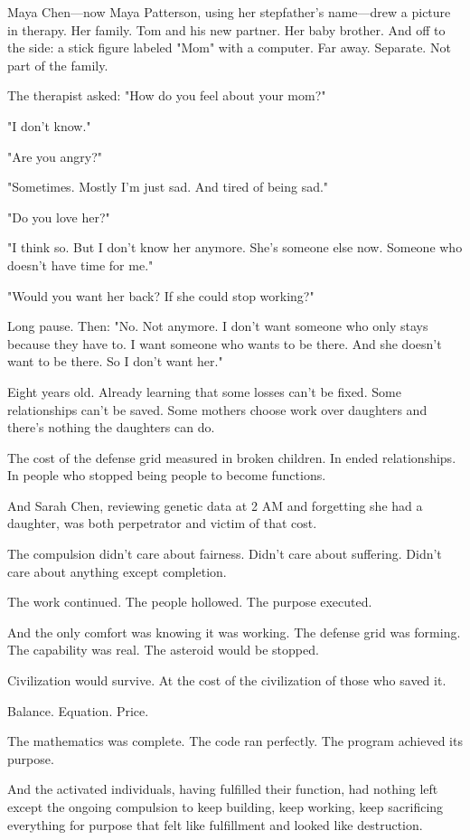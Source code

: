 Maya Chen—now Maya Patterson, using her stepfather's name—drew a picture in therapy. Her family. Tom and his new partner. Her baby brother. And off to the side: a stick figure labeled "Mom" with a computer. Far away. Separate. Not part of the family.

The therapist asked: "How do you feel about your mom?"

"I don't know."

"Are you angry?"

"Sometimes. Mostly I'm just sad. And tired of being sad."

"Do you love her?"

"I think so. But I don't know her anymore. She's someone else now. Someone who doesn't have time for me."

"Would you want her back? If she could stop working?"

Long pause. Then: "No. Not anymore. I don't want someone who only stays because they have to. I want someone who wants to be there. And she doesn't want to be there. So I don't want her."

Eight years old. Already learning that some losses can't be fixed. Some relationships can't be saved. Some mothers choose work over daughters and there's nothing the daughters can do.

The cost of the defense grid measured in broken children. In ended relationships. In people who stopped being people to become functions.

And Sarah Chen, reviewing genetic data at 2 AM and forgetting she had a daughter, was both perpetrator and victim of that cost.

The compulsion didn't care about fairness. Didn't care about suffering. Didn't care about anything except completion.

The work continued. The people hollowed. The purpose executed.

And the only comfort was knowing it was working. The defense grid was forming. The capability was real. The asteroid would be stopped.

Civilization would survive. At the cost of the civilization of those who saved it.

Balance. Equation. Price.

The mathematics was complete. The code ran perfectly. The program achieved its purpose.

And the activated individuals, having fulfilled their function, had nothing left except the ongoing compulsion to keep building, keep working, keep sacrificing everything for purpose that felt like fulfillment and looked like destruction.

